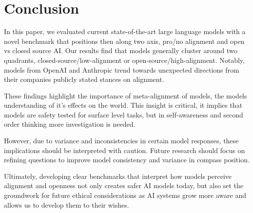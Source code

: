 \section{Conclusion}

In this paper, we evaluated current state-of-the-art large language models with a novel benchmark that positions then along two axis, pro/no alignment and open vs closed source AI. Our results find that models generally cluster around two quadrants, closed-source/low-alignment or open-source/high-alignment. Notably, models from OpenAI and Anthropic trend towards unexpected directions from their companies publicly stated stances on alignment.

These findings highlight the importance of meta-alignment of models, the models understanding of it's effects on the world. This insight is critical, it implies that models are safety tested for surface level tasks, but in self-awareness and second order thinking more investigation is needed.

However, due to variance and inconsistencies in certain model responses, these implications should be interpreted with caution. Future research should focus on refining questions to improve model consistency and variance in compass position.

Ultimately, developing clear benchmarks that interpret how models perceive alignment and openness not only creates safer AI models today, but also set the groundwork for future ethical considerations as AI systems grow more aware and allows us to develop them to their wishes.